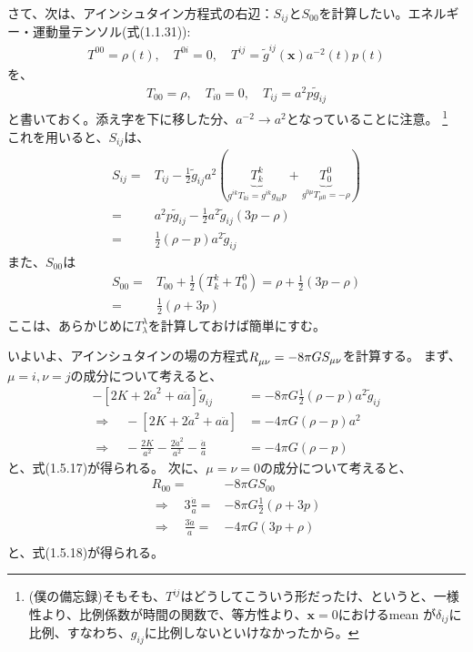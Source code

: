 \documentclass[11pt]{ltjsarticle}
\theoremstyle{plain}
\theoremstyle{break}
\begin{document}
さて、次は、アインシュタイン方程式の右辺：$S_{ij}$と$S_{00}$を計算したい。エネルギー・運動量テンソル(式(1.1.31)):
\begin{align}
 T^{00}=\rho(t), \quad T^{0 i}=0, \quad T^{i j}=\tilde{g}^{i j}(\mathbf{x}) a^{-2}(t) p(t)
\end{align}%
を、
\begin{align}
 T_{00}=\rho, \quad T_{i 0}=0, \quad T_{i j}=a^{2} p \tilde{g}_{i j}
\end{align}%
と書いておく。添え字を下に移した分、$a^{-2} \rightarrow a^2$となっていることに注意。
\footnote{(僕の備忘録)そもそも、$T^{ij}$はどうしてこういう形だったけ、というと、一様性より、比例係数が時間の関数で、等方性より、$\mathbf{x}=0$におけるmean が$\delta_{ij}$に比例、すなわち、$g_{ij}$に比例しないといけなかったから。}
\\これを用いると、$S_{ij}$は、
\begin{align}
 S_{i j}
 	=&T_{i j}-\frac{1}{2} \tilde{g}_{i j} a^{2}(\underbrace{T_{k}^{k}}_{g^{ik} T_{ki} =g^{ik} g_{ki} p }+\underbrace{T_{0}^{0}}_{g^{0\mu}T_{\mu 0}=- \rho } )\\
 	=&a^{2} p \tilde{g}_{i j}-\frac{1}{2} a^{2} \tilde{g}_{i j}(3 p-\rho)\\
	=&\frac{1}{2}(\rho-p) a^{2} \tilde{g}_{i j}
\end{align}%
また、$S_{00}$は
\begin{align}
 S_{00}
 	=&T_{00}+\frac{1}{2}\left(T_{k}^{k}+T_{0}^{0}\right)
	=\rho+\frac{1}{2}(3 p-\rho)\\
	=&\frac{1}{2}(\rho+3 p)
\end{align}%
ここは、あらかじめに$T^\lambda_{\lambda}$を計算しておけば簡単にすむ。

いよいよ、アインシュタインの場の方程式$\tensor{R}{_{\mu \nu}} = -8\pi G S_{\mu \nu}$を計算する。
まず、$\mu = i ,\nu = j$の成分について考えると、
\begin{align}
  -\left[2 K+2 \dot{a}^{2}+a \ddot{a}\right] \tilde{g}_{i j} &=-8\pi G \frac{1}{2}(\rho-p) a^{2} \tilde{g}_{i j} \\
   \Rightarrow  \quad -\left[2 K+2 \dot{a}^{2}+a \ddot{a}\right] &=-4\pi G (\rho-p) a^{2}  \\
   \Rightarrow  \quad -\frac{2 K}{a^{2}}-\frac{2 \dot{a}^{2}}{a^{2}}-\frac{\ddot{a}}{a}&=-4 \pi G(\rho-p)
\end{align}%
と、式(1.5.17)が得られる。
次に、$\mu = \nu = 0$の成分について考えると、
\begin{align}
  R_{00} =& -8 \pi G S_{00} \\
  \Rightarrow \quad 3 \frac{\ddot{a}}{a} =& -8 \pi G \frac{1}{2} ( \rho + 3 p) \\
  \Rightarrow \quad \frac{3\ddot{a}}{a} =& -4 \pi G  ( 3 p + \rho) \\
\end{align}%
と、式(1.5.18)が得られる。 \\
\end{document}

